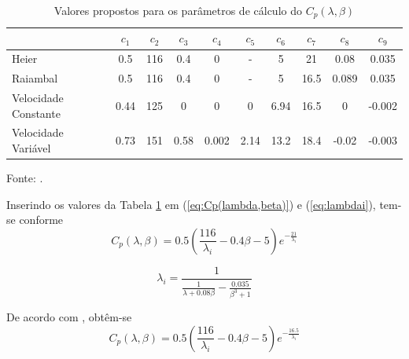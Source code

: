     \begin{table}[H]
        \centering
        \caption{Valores propostos para os parâmetros de cálculo do $C_p(\lambda, \beta)$}
        \label{tab:parametros}
        \begin{tabular}{@{}lccccccccc@{}}
            \toprule
                              & $c_1$ & $c_2$ & $c_3$ & $c_4$ & $c_5$ & $c_6$ & $c_7$ & $c_8$ & $c_9$ \\ \midrule
            Heier             & 0.5   & 116   & 0.4   & 0     & -     & 5     & 21    & 0.08  & 0.035 \\
            Raiambal             & 0.5   & 116   & 0.4   & 0     & -     & 5     & 16.5    & 0.089  & 0.035 \\
            Velocidade Constante & 0.44  & 125   & 0     & 0     & 0     & 6.94  & 16.5  & 0     & -0.002\\
            Velocidade Variável  & 0.73  & 151   & 0.58  & 0.002 & 2.14  & 13.2  & 18.4  & -0.02 & -0.003\\ \bottomrule
        \end{tabular}
            \begin{flushleft}
                \footnotesize{Fonte: .}
            \end{flushleft}
    \end{table}

    \par Inserindo os valores da Tabela \ref{tab:parametros} em (\ref{eq:Cp(lambda,beta)}) e (\ref{eq:lambdai}), tem-se conforme  
    \begin{equation}
        C_p(\lambda, \beta) = 0.5 \left( \frac{116}{\lambda_i} - 0.4 \beta - 5 \right) e^{-\frac{21}{\lambda_i}} 
        \label{eq:Cp(lambda,beta) Heier}
    \end{equation}
   
    \begin{equation}
        \lambda_i = \frac{1}{\frac{1}{\lambda + 0.08 \beta} -\frac{0.035}{\beta^3 + 1}}
        \label{eq:lambdai Heier}
    \end{equation}
    
    De acordo com , obtêm-se
        \begin{equation}
        C_p(\lambda, \beta) = 0.5 \left( \frac{116}{\lambda_i} - 0.4 \beta - 5 \right) e^{-\frac{16.5}{\lambda_i}} 
        \label{eq:Cp(lambda,beta) Raiambal}
    \end{equation}
   
